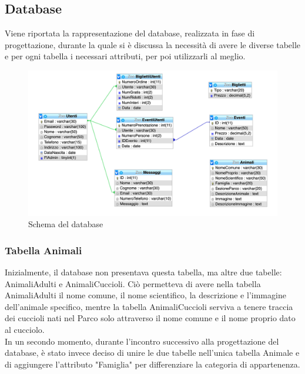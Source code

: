     \subsection{Database}
    Viene riportata la rappresentazione del database, realizzata in fase di progettazione, durante la quale si è discussa la necessità di avere le diverse tabelle e per ogni tabella i necessari attributi, per poi utilizzarli al meglio.
    \begin{figure}[H]
        \centering
        \includegraphics[width=15cm]{./img/database.png}
        \caption{Schema del database}  \label{fig:xray}
    \end{figure}
	\subsubsection{Tabella Animali}
	Inizialmente, il database non presentava questa tabella, ma altre due tabelle: AnimaliAdulti e AnimaliCuccioli. Ciò permetteva di avere nella tabella AnimaliAdulti il nome comune, il nome scientifico, la descrizione e l'immagine dell'animale specifico, mentre la tabella AnimaliCuccioli serviva a tenere traccia dei cuccioli nati  nel Parco solo attraverso il nome comune e il nome proprio dato al cucciolo.\\
	In un secondo momento, durante l'incontro successivo alla progettazione del database, è stato invece deciso di unire le due tabelle nell'unica tabella Animale e di aggiungere l'attributo "Famiglia" per differenziare la categoria di appartenenza.
\pagebreak